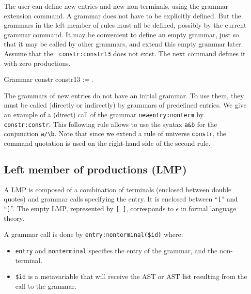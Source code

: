 The user can define new entries and new non-terminals, using the
grammar extension command. A grammar does not have to be explicitly
defined. But the grammars in the left member of rules must all be
defined, possibly by the current grammar command. It may be convenient
to define an empty grammar, just so that it may be called by other
grammars, and extend this empty grammar later.  Assume that the {\tt
constr:constr13} does not exist. The next command defines it with
zero productions.

\begin{coq_example*}
Grammar constr constr13 := .
\end{coq_example*}

The grammars of new entries do not have an initial grammar. To use
them, they must be called (directly or indirectly) by grammars of
predefined entries. We give an example of a (direct) call of the
grammar {\tt newentry:nonterm} by {\tt constr:constr}.  This following
rule allows to use the syntax \verb+a&b+ for the conjunction
\verb+a/\b+. Note that since we extend a rule of universe
\verb+constr+, the command quotation is used on the right-hand side of
the second rule.



\subsection{Left member of productions (LMP)}

A LMP is composed of a combination of terminals (enclosed between
double quotes) and grammar calls specifying the entry. It is enclosed
between ``\verb+[+'' and ``\verb+]+''. The empty LMP, represented by
\verb+[ ]+, corresponds to $\epsilon$ in formal language theory.

A grammar call is done by \verb+entry:nonterminal($id)+ where:
\begin{itemize}
\item \verb+entry+ and \verb+nonterminal+ 
  specifies the entry of the grammar, and the non-terminal.
\item \verb+$id+ is a metavariable that will receive the AST or AST
  list resulting from the call to the grammar.
\end{itemize}

